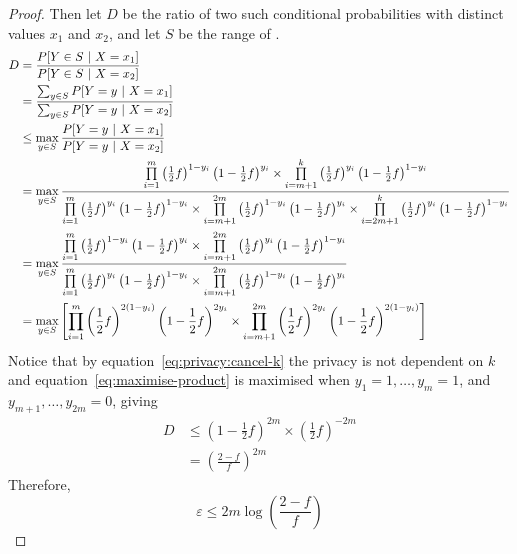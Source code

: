 \documentclass{article}
\begin{document}
\begin{enumerate}
\begin{proof}
	Then let $D$ be the ratio of two such conditional probabilities with distinct values $x_1$ and $x_2$, and let $S$ be the range of .
	\begin{align}
		D &= \frac{P[Y\in S~|~X=x_1]}{P[Y\in S~|~X=x_2]}\\
			&= \frac{\sum_{y\in S}P[Y=y~|~X=x_1]}{\sum_{y\in S}P[Y=y~|~X=x_2]}\nonumber\\
			&\leq \max_{y\in S}\frac{P[Y=y~|~X=x_1]}{P[Y=y~|~X=x_2]}\nonumber\\
			&=\max_{y\in S}\frac{%
				\prod\limits_{i=1}^m \left(\frac{1}{2}f\right)^{1-y_i}\left(1-\frac{1}{2}f\right)^{y_i}%
				\times \prod\limits_{i=m+1}^k\left(\frac{1}{2}f\right)^{y_i} \left(1-\frac{1}{2}f\right)^{1-y_i}
			}{%
				\prod\limits_{i=1}^m \left(\frac{1}{2}f\right)^{y_i}\left(1-\frac{1}{2}f\right)^{1-y_i}%
				\times \prod\limits_{i=m+1}^{2m}\left(\frac{1}{2}f\right)^{1-y_i} \left(1-\frac{1}{2}f\right)^{y_i}\times%
				\prod\limits_{i=2m+1}^{k}\left(\frac{1}{2}f\right)^{y_i}\left(1-\frac{1}{2}f\right)^{1-y_i}
			}\nonumber\\
			&=\max_{y\in S}\frac{%
				\prod\limits_{i=1}^m \left(\frac{1}{2}f\right)^{1-y_i}\left(1-\frac{1}{2}f\right)^{y_i}%
				\times \prod\limits_{i=m+1}^{2m}\left(\frac{1}{2}f\right)^{y_i} \left(1-\frac{1}{2}f\right)^{1-y_i}%
			}{%
				\prod\limits_{i=1}^m \left(\frac{1}{2}f\right)^{y_i}\left(1-\frac{1}{2}f\right)^{1-y_i}%
				\times \prod\limits_{i=m+1}^{2m}\left(\frac{1}{2}f\right)^{1-y_i} \left(1-\frac{1}{2}f\right)^{y_i}%
			}\label{eq:privacy:cancel-k}\\
			&=\max_{y\in S}\left[%
				\prod\limits_{i=1}^m \left(\frac{1}{2}f\right)^{2(1-y_i)}\left(1-\frac{1}{2}f\right)^{2y_i}%
				\times \prod\limits_{i=m+1}^{2m}\left(\frac{1}{2}f\right)^{2y_i} \left(1-\frac{1}{2}f\right)^{2(1-y_i)}\right]\label{eq:maximise-product}%
	\end{align}
	Notice that by equation~\ref{eq:privacy:cancel-k} the privacy is not dependent on $k$ and equation~\ref{eq:maximise-product} is maximised when $y_1=1,\ldots,y_m=1$, and $y_{m+1},\ldots,y_{2m}=0$, giving
	\begin{align*}
		D &\leq \left(1-\frac{1}{2}f\right)^{2m}\times\left(\frac{1}{2}f\right)^{-2m}\\
			&= \left(\frac{2-f}{f}\right)^{2m}
	\end{align*}
	Therefore,
	\begin{equation}
		\varepsilon \leq 2m\log\left(\frac{2-f}{f}\right)
	\end{equation}

\end{proof}
\end{enumerate}
\end{document}
